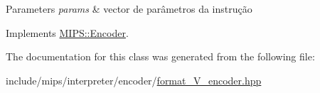 \begin{DoxyParams}{Parameters}
{\em params} & vector de parâmetros da instrução \\
\hline
\end{DoxyParams}


Implements \hyperlink{classMIPS_1_1Encoder_a4a29c42d601460be8e8d353d8fc0da34}{M\+I\+P\+S\+::\+Encoder}.



The documentation for this class was generated from the following file\+:\begin{DoxyCompactItemize}
\item 
include/mips/interpreter/encoder/\hyperlink{format__V__encoder_8hpp}{format\+\_\+\+V\+\_\+encoder.\+hpp}\end{DoxyCompactItemize}
